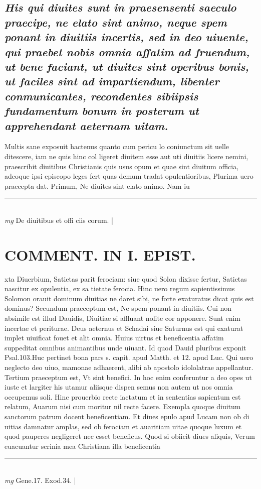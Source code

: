 \documentclass{article}
\begin{document}
\begin{pages}
\subsection*{\textit{His qui diuites sunt in praesensenti saeculo praecipe, ne elato sint animo, neque spem ponant in diuitiis incertis, sed in deo uiuente, qui praebet nobis omnia affatim ad fruendum, ut bene faciant, ut diuites sint operibus bonis, ut faciles sint ad impartiendum, libenter conmunicantes, recondentes sibiipsis fundamentum bonum in posterum ut apprehendant aeternam uitam. }}\pstart Multis sane exposuit hactenus quanto cum pericu lo coniunctum sit uelle ditescere, iam ne quis hinc col ligeret diuitem esse aut uti diuitiis licere nemini, praescribit diuitibus Christianis quis usus opum et quae sint diuitum officia, adeoque ipsi episcopo leges fert quas demum tradat opulentioribus, Plurima uero praecepta dat. Primum, Ne diuites sint elato animo. Nam iu  \pend
\vspace{0.5cm}\noindent
\vspace{0.2cm}\rule{1cm}{0.2pt}\\ 
\hspace{0.2cm}\textit{mg}
\footnotesize De diuitibus et offi ciis corum. 
\normalsize| 
\section*{COMMENT. IN I. EPIST. }\pstart xta Diuerbium, Satietas parit ferociam: siue quod Solon dixisse fertur, Satietas nascitur ex opulentia, ex sa tietate ferocia. Hinc uero regum sapientissimus Solomon orauit dominum diuitias ne daret sibi, ne forte exaturatus dicat quis est dominus? Secundum praeceptum est, Ne spem ponant in diuitiis. Cui non absimile est illud Dauidis, Diuitiae si affluant nolite cor apponere. Sunt enim incertae et periturae. Deus aeternus et Schadai siue Saturnus est qui exaturat implet uiuificat fouet et alit omnia. Huius uirtus et beneficentia affatim suppeditat omnibus animantibus unde uiuant. Id quod Dauid pluribus exponit Psal.103.Huc pertinet bona pars s. capit. apud Matth. et 12. apud Luc. Qui uero neglecto deo uiuo, mamonae adhaerent, alibi ab apostolo idololatrae appellantur. Tertium praeceptum est, Vt sint benefici. In hoc enim conferuntur a deo opes ut iuste et largiter his utamur aliisque dispen semus non autem ut nos omnia occupemus soli. Hinc prouerbio recte iactatum et in sententias sapientum est relatum, Auarum nisi cum moritur nil recte facere. Exempla quoque diuitum sanctorum patrum docent beneficentiam. Et diues epulo apud Lucam non ob di uitias damnatur amplas, sed ob ferociam et auaritiam uitae quoque luxum et quod pauperes negligeret nec esset beneficus. Quod si obiicit diues aliquis, Verum euacuantur scrinia mea Christiana illa beneficentia  \pend
\vspace{0.5cm}\noindent
\vspace{0.2cm}\rule{1cm}{0.2pt}\\ 
\hspace{0.2cm}\textit{mg}
\footnotesize Gene.17. Exod.34. 
\normalsize| 

\end{pages}
\end{document}
